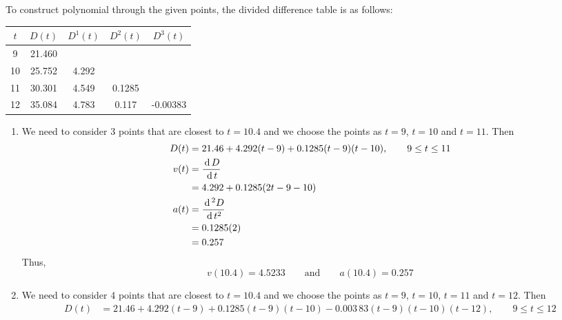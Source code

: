 \documentclass[12pt,class=book,crop=false]{standalone}
\begin{document}
\begin{soln}
    To construct  polynomial through the given points, the divided difference table is as follows:
    \begin{table}
        \centering
        \begin{tabular}{c*{3}{S[table-format=3.4]}S[table-format=2.5]}
            \toprule
            $ t $ &  &  & & \\     & 21.460   &            &            &            \\
            10    & 25.752   & 4.292      &            &            \\
            11    & 30.301   & 4.549      & 0.1285     &            \\
            12    & 35.084   & 4.783      & 0.117      & -0.00383   \\\bottomrule
        \end{tabular}
    \end{table}
    \begin{enumerate}[label=(\alph*)]
        \item We need to consider 3 points that are closest to $ t=10.4 $ and we choose the points as $ t=9 $,  $ t=10 $ and $ t=11 $. Then
              \begin{align*}
                  D(t) & =21.46+4.292(t-9)+0.1285(t-9)(t-10),\qquad 9\leq t\leq 11 \\
                  v(t) & =\frac{\,\mathrm{d}\, D}{\,\mathrm{d}\, t}                                        \\
                       & =4.292+0.1285(2t-9-10)                                    \\
                  a(t) & =\frac{\,\mathrm{d}\,^2 D}{\,\mathrm{d}\, t^2}                                    \\
                       & =0.1285(2)                                                \\
                       & =0.257
              \end{align*}
              Thus,
              \[
                  v(10.4)=4.5233\qquad \text{and}\qquad a(10.4)=0.257
              \]
        \item We need to consider 4 points that are closest to $ t=10.4 $ and we choose the points as $ t=9 $,  $ t=10 $, $ t=11 $ and $ t=12 $. Then
              \begin{align*}
                  D(t) & =21.46+4.292(t-9)+0.1285(t-9)(t-10)-0.003\,83(t-9)(t-10)(t-12),\qquad 9\leq t\leq 12 \\

\end{align*}
\end{enumerate}
\end{soln}
\end{document}

